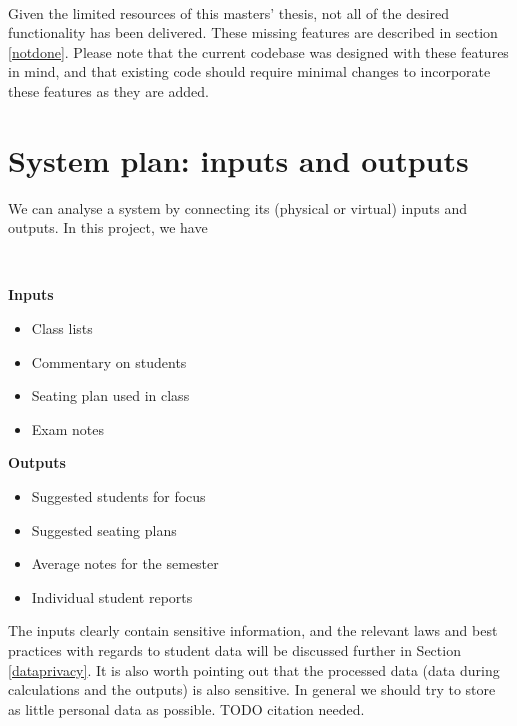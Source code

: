 \documentclass[10pt]{article}
\begin{document}
\

Given the limited resources of this masters' thesis, not all of the desired functionality has been delivered. These missing features are described in section \ref{notdone}. Please note that the current codebase was designed with these features in mind, and that existing code should require minimal changes to incorporate these features as they are added.


\section{System plan: inputs and outputs} \label{inout}

We can analyse a system by connecting its (physical or virtual) inputs and outputs. In this project, we have

\

\begin{minipage}[t]{0.38\textwidth}

\textbf{Inputs}

\begin{itemize}
\item Class lists
\item Commentary on students
\item Seating plan used in class
\item Exam notes
\end{itemize}


\end{minipage}
\hfill
\vline
\hfill
\begin{minipage}[t]{0.48\textwidth}

\textbf{Outputs}

\begin{itemize}
\item Suggested students for focus
\item Suggested seating plans
\item Average notes for the semester
\item Individual student reports
\end{itemize}

\end{minipage}

\vspace{5mm}

The inputs clearly contain sensitive information, and the relevant laws and best practices with regards to student data will be discussed further in Section \ref{dataprivacy}. It is also worth pointing out that the processed data (data during calculations and the outputs) is also sensitive. In general we should try to store as little personal data as possible. TODO citation needed.
\end{document}
